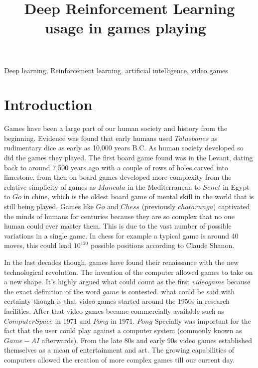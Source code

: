 \documentclass[conference]{IEEEtran}
\begin{document}
\title{Deep Reinforcement Learning usage in games playing\
}

\author{
}





\maketitle

\begin{abstract}

\end{abstract}

\begin{IEEEkeywords}
Deep learning, Reinforcement learning, artificial intelligence, video games
\end{IEEEkeywords}

\section{Introduction}
Games have been a large part of our human society and history from the beginning. Evidence was found that early humans used $Talus bones$ as rudimentary dice as early as 10,000 years B.C\cite{10.1007/978-981-10-0575-6_1       }. As human society developed so did the games they played. The first board game found was in the Levant, dating back to around 7,500 years ago \cite{simpson2007earliest} with a couple of rows of holes carved into limestone. from then on board games developed more complexity from the relative simplicity of games as $Mancala$ in the Mediterranean to $Senet$ in Egypt to $Go$ in chine, which is the  oldest board game of mental skill in the world that is still being played\cite{shotwell1994game}. Games like $Go$ and $Chess$ (previously $chatarunga$) captivated the minds of humans for centuries because they are so complex that no one human could ever master them. This is due to the vast number of possible variations in a single game. In chess for example a typical game is around 40 moves, this could lead $10^{120}$ possible positions according to Claude Shanon\cite{shannon1950xxii}.

In the last decades though, games have found their renaissance with the new technological revolution. The invention of the computer allowed games to take on a new shape. It's highly argued what could count as the first $video game$ because the exact definition of the word $game$ is contested. what could be said with certainty though is that video games started around the 1950s in research facilities. After that video games became commercially available such as $Computer Space$ in 1971 and $Pong$ in 1971. $Pong$ Specially was important for the fact that the user could play against a computer system (commonly known as $Game-AI$ afterwards). From the late 80s and early 90s video games established themselves as a mean of entertainment and art. The growing capabilities of computers allowed the creation of more complex games till our current day.
\end{document}
